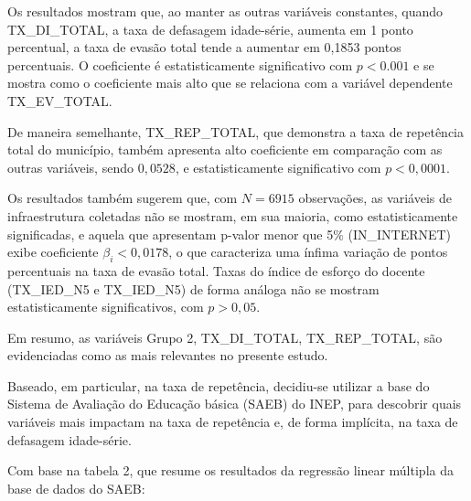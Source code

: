 \documentclass[english, spanish, brazilian]{RBIEarticle} %
\begin{document}
Os resultados mostram que, ao manter as outras variáveis constantes, quando TX\_DI\_TOTAL, a taxa de defasagem idade-série, aumenta em 1 ponto percentual, a taxa de evasão total tende a aumentar em 0,1853 pontos percentuais. O coeficiente é estatisticamente significativo com $p<0.001$ e se mostra como o coeficiente mais alto que se relaciona com a variável dependente TX\_EV\_TOTAL.

De maneira semelhante, TX\_REP\_TOTAL, que demonstra a taxa de repetência total do município, também apresenta alto coeficiente em comparação com as outras variáveis, sendo $0,0528$, e estatisticamente significativo com $p<0,0001$.

Os resultados também sugerem que, com $N=6915$ observações, as variáveis de infraestrutura coletadas não se mostram, em sua maioria, como estatisticamente significadas, e aquela que apresentam p-valor menor que 5\% (IN\_INTERNET) exibe coeficiente $\beta_i<0,0178$, o que caracteriza uma ínfima variação de pontos percentuais na taxa de evasão total. Taxas do índice de esforço do docente (TX\_IED\_N5 e TX\_IED\_N5) de forma análoga não se mostram estatisticamente significativos, com $p>0,05$.

Em resumo, as variáveis Grupo 2, TX\_DI\_TOTAL, TX\_REP\_TOTAL, são evidenciadas como as mais relevantes no presente estudo. 

Baseado, em particular, na taxa de repetência, decidiu-se utilizar a base do Sistema de Avaliação do Educação básica (SAEB) do INEP, para descobrir quais variáveis mais impactam na taxa de repetência e, de forma implícita, na taxa de defasagem idade-série.

Com base na tabela 2, que resume os resultados da regressão linear múltipla da base de dados do SAEB:
\end{document}
